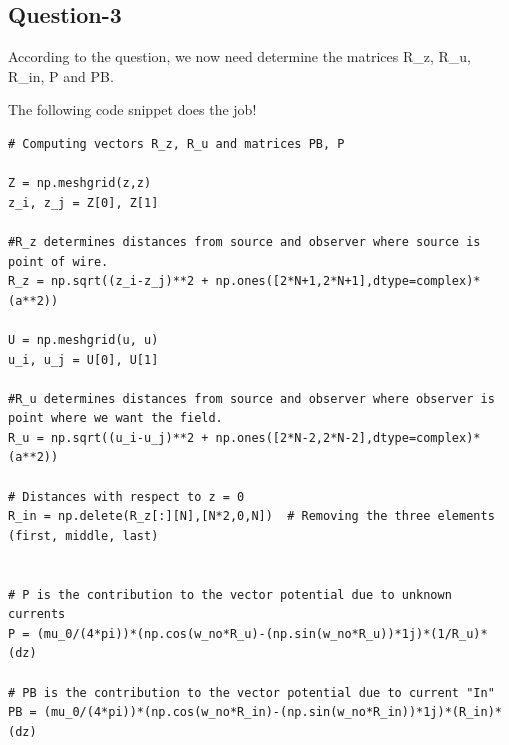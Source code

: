 \documentclass{article}
\begin{document}
\subsection{Question-3}
According to the question, we now need determine the matrices R_z, R_u, R_in, P and PB.

\newline The following code snippet does the job!
\begin{verbatim}
# Computing vectors R_z, R_u and matrices PB, P

Z = np.meshgrid(z,z)
z_i, z_j = Z[0], Z[1]

#R_z determines distances from source and observer where source is point of wire.
R_z = np.sqrt((z_i-z_j)**2 + np.ones([2*N+1,2*N+1],dtype=complex)*(a**2))

U = np.meshgrid(u, u)
u_i, u_j = U[0], U[1]

#R_u determines distances from source and observer where observer is point where we want the field.
R_u = np.sqrt((u_i-u_j)**2 + np.ones([2*N-2,2*N-2],dtype=complex)*(a**2))

# Distances with respect to z = 0
R_in = np.delete(R_z[:][N],[N*2,0,N])  # Removing the three elements (first, middle, last) 


# P is the contribution to the vector potential due to unknown currents
P = (mu_0/(4*pi))*(np.cos(w_no*R_u)-(np.sin(w_no*R_u))*1j)*(1/R_u)*(dz)

# PB is the contribution to the vector potential due to current "In"
PB = (mu_0/(4*pi))*(np.cos(w_no*R_in)-(np.sin(w_no*R_in))*1j)*(R_in)*(dz)
\end{verbatim}
\end{document}
